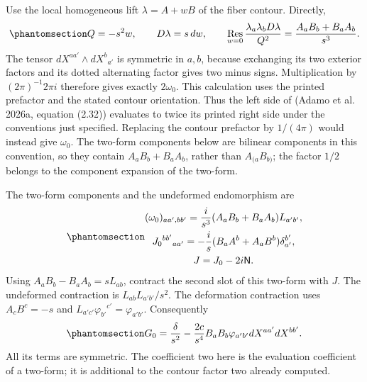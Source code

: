\documentclass[
  english,
  11pt,
  reqno]{amsart}
\begin{document}
Use the local homogeneous lift \(\lambda=A+wB\) of the fiber contour.
Directly,
\begin{equation}\protect\phantomsection\label{eq:sh-r1-residue}{
 Q=-s^2w,\qquad D\lambda=s\,dw,\qquad
 \operatorname*{Res}_{w=0}\frac{\lambda_a\lambda_bD\lambda}{Q^2}
       =\frac{A_aB_b+B_aA_b}{s^3}.
}\end{equation} The tensor \(dX^{aa'}\wedge dX^b{}_{a'}\) is symmetric
in \(a,b\), because exchanging its two exterior factors and its dotted
alternating factor gives two minus signs. Multiplication by
\((2\pi)^{-1}2\pi i\) therefore gives exactly \(2\omega_0\). This
calculation uses the printed prefactor and the stated contour
orientation. Thus the left side of (Adamo et al. 2026a, equation (2.32))
evaluates to twice its printed right side under the conventions just
specified. Replacing the contour prefactor by \(1/(4\pi)\) would instead
give \(\omega_0\). The two-form components below are bilinear components
in this convention, so they contain \(A_aB_b+B_aA_b\), rather than
\(A_{(a}B_{b)}\); the factor \(1/2\) belongs to the component expansion
of the two-form.

The two-form components and the undeformed endomorphism are
\begin{equation}\protect\phantomsection\label{eq:sh-r1-form-components}{\begin{gathered}
(\omega_0)_{aa',bb'}=
 \frac{i}{s^3}(A_aB_b+B_aA_b)L_{a'b'}, \\
J_0{}^{bb'}{}_{aa'}=-\frac i s(B_aA^b+A_aB^b)\delta_{a'}^{b'}, \\
J=J_0-2i\mathsf N.
\end{gathered}}\end{equation} Using \(A_aB_b-B_aA_b=sL_{ab}\), contract the second
slot of this two-form with \(J\). The undeformed contraction is
\(L_{ab}L_{a'b'}/s^2\). The deformation contraction uses \(A_cB^c=-s\)
and \(L_{a'c'}\varphi_{b'}{}^{c'}=\varphi_{a'b'}\). Consequently
\begin{equation}\protect\phantomsection\label{eq:sh-r1-unspecialized-metric}{
 G_0=\frac{\delta}{s^2}
       -\frac{2c}{s^4}B_aB_b\varphi_{a'b'}dX^{aa'}dX^{bb'}.
}\end{equation} All its terms are symmetric. The coefficient two here is
the evaluation coefficient of a two-form; it is additional to the
contour factor two already computed.
\end{document}
